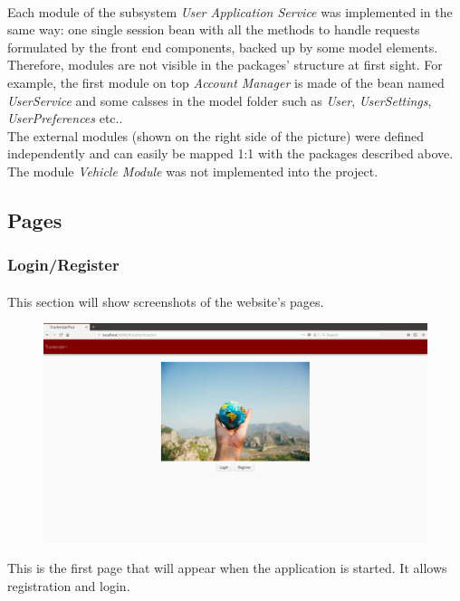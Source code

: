 \documentclass{article}
\begin{document}
			\paragraph{}
Each module of the subsystem \textit{User Application Service} was implemented in the same way: one single session bean with all the methods to handle requests formulated by the front end components, backed up by some model elements. Therefore, modules are not visible in the packages' structure at first sight. For example, the first module on top \textit{Account Manager} is made of the bean named \textit{UserService} and some calsses in the model folder such as \textit{User}, \textit{UserSettings}, \textit{UserPreferences} etc..\\The external modules (shown on the right side of the picture) were defined independently and can easily be mapped 1:1 with the packages described above.\\The module \textit{Vehicle Module} was not implemented into the project.
\newpage
		\subsection{Pages}
			\subsubsection{Login/Register}
		\paragraph{}This section will show screenshots of the website's pages.
			\begin{figure}[H]
			\includegraphics[width=\linewidth]{Images/Pages/1-Login.png}
			\label{fig:Login}
			\end{figure}
		This is the first page that will appear when the application is started. It allows registration and login.
\end{document}

